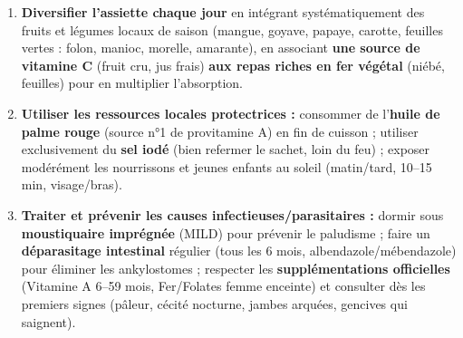 \documentclass[11pt]{article}
\begin{document}
\begin{aretenir}
\begin{enumerate}
\item \textbf{Diversifier l'assiette chaque jour} en intégrant systématiquement des fruits et légumes locaux de saison (mangue, goyave, papaye, carotte, feuilles vertes : folon, manioc, morelle, amarante), en associant \textbf{une source de vitamine C} (fruit cru, jus frais) \textbf{aux repas riches en fer végétal} (niébé, feuilles) pour en multiplier l'absorption.
\item \textbf{Utiliser les ressources locales protectrices :} consommer de l'\textbf{huile de palme rouge} (source n°1 de provitamine A) en fin de cuisson ; utiliser exclusivement du \textbf{sel iodé} (bien refermer le sachet, loin du feu) ; exposer modérément les nourrissons et jeunes enfants au soleil (matin/tard, 10--15 min, visage/bras).
\item \textbf{Traiter et prévenir les causes infectieuses/parasitaires :} dormir sous \textbf{moustiquaire imprégnée} (MILD) pour prévenir le paludisme ; faire un \textbf{déparasitage intestinal} régulier (tous les 6 mois, albendazole/mébendazole) pour éliminer les ankylostomes ; respecter les \textbf{supplémentations officielles} (Vitamine A 6--59 mois, Fer/Folates femme enceinte) et consulter dès les premiers signes (pâleur, cécité nocturne, jambes arquées, gencives qui saignent).
\end{enumerate}
\end{aretenir}
\end{document}
